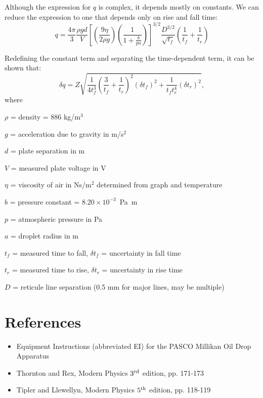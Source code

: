 Although the expression for $q$ is complex, it depends mostly on constants. We
can reduce the expression to one that depends only on rise and fall time:
\begin{equation}
q = \frac{4\pi}{3} \frac{\rho g d}{V} \left[ \left(\frac{9\eta}{2\rho g}\right)
  \left(\frac{1}{1 + \frac{b}{p a}}\right) \right]^{3/2} \frac{D^{3/2}}{\sqrt{t_f}}
\left(\frac{1}{t_f} + \frac{1}{t_r} \right)
\end{equation}

Redefining the constant term and separating the time-dependent term, it can be
shown that:
\begin{equation}
\delta q = Z \sqrt{ \frac{1}{4t_f^3} \left( \frac{3}{t_f} +
  \frac{1}{t_r}\right)^2 (\delta t_f)^2 + \frac{1}{t_f t_r^4} (\delta t_r)^2 },
\end{equation}
where
\begin{itemize*}
\item $\rho$ = density = 886 kg/m$^3$
\item $g$ = acceleration due to gravity in m/s$^2$
\item $d$ = plate separation in m
\item $V$ = measured plate voltage in V
\item $\eta$ = viscosity of air in Ns/m$^2$ determined from graph and
  temperature 
\item $b$ = pressure constant = $8.20\times10^{-3}$~Pa~m
\item $p$ = atmospheric pressure in Pa
\item $a$ = droplet radius in m
\item $t_f$ = measured time to fall, $\delta t_f$ = uncertainty in fall time
\item $t_r$ = measured time to rise, $\delta t_r$ = uncertainty in rise time
\item $D$ = reticule line separation (0.5 mm for major lines, may be multiple)
\end{itemize*}

\section{References}

\begin{itemize}
\item Equipment Instructions (abbreviated EI) for the PASCO Millikan Oil Drop Apparatus
\item Thornton and Rex, Modern Physics $3^{\rm rd}$ edition, pp. 171-173
\item Tipler and Llewellyn, Modern Physics $5^{\rm th}$ edition, pp. 118-119
\end{itemize}

